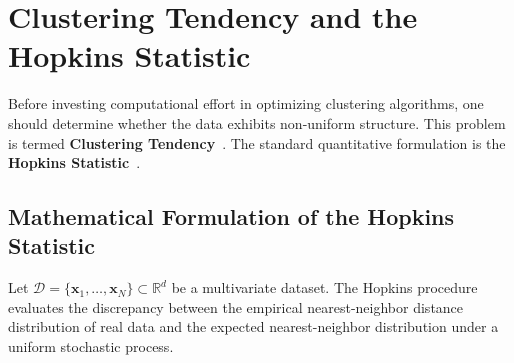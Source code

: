\section{Clustering Tendency and the Hopkins Statistic}
\label{sec:dm-hopkins-statistic}

Before investing computational effort in optimizing clustering algorithms, one should determine whether the data exhibits non-uniform structure. This problem is termed \textbf{Clustering Tendency}~\cite{tan2018}. The standard quantitative formulation is the \textbf{Hopkins Statistic}~\cite{hopkins1954, jain1988}.

\subsection{Mathematical Formulation of the Hopkins Statistic}
Let $\mathcal{D} = \{\mathbf{x}_1, \dots, \mathbf{x}_N\} \subset \mathbb{R}^d$ be a multivariate dataset. The Hopkins procedure evaluates the discrepancy between the empirical nearest-neighbor distance distribution of real data and the expected nearest-neighbor distribution under a uniform stochastic process.

